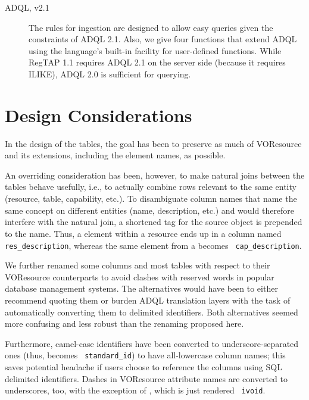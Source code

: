 \documentclass[11pt,a4paper]{ivoa}
\newcommand{\rtent}[1]{\texttt{\color{rtcolor} #1}}
\begin{document}
\begin{description}
\item[ADQL, v2.1 \citep{TODO}]The rules for ingestion are designed to allow
easy queries given the constraints of ADQL 2.1.  Also,
we give four functions that extend ADQL using the
language's built-in facility for user-defined functions.  While RegTAP
1.1 requires ADQL 2.1 on the server side (because it requires ILIKE),
ADQL 2.0 is sufficient for querying.
\end{description}


\section{Design Considerations}

\label{design}

In the design of the tables, the goal has been to preserve as much of
VOResource and its extensions, including the element names, as
possible.

An overriding consideration has been, however, to make natural joins
between the tables behave usefully, i.e., to actually combine rows
relevant to the same entity (resource, table, capability, etc.).
To disambiguate column names that name the same concept on different
entities (name, description, etc.) and would therefore interfere with
the natural join, a shortened tag for the source object
is prepended to the name.  Thus, a  element within
a resource ends up in a column named
\rtent{res\_description}, whereas the same element from a
 becomes \rtent{cap\_description}.

We further renamed some columns and most tables 
with respect to their VOResource
counterparts to avoid clashes with reserved words in popular database
management systems.  The alternatives would have been to either recommend
quoting them or burden ADQL translation layers with the task of
automatically converting them to delimited identifiers.  Both
alternatives seemed more confusing and less robust than the renaming
proposed here.

Furthermore, camel-case identifiers have been converted to
underscore-separated ones (thus,   becomes
\rtent{standard\_id}) to have all-lowercase column names; this saves
potential headache if users choose to reference the columns using SQL
delimited identifiers.  Dashes in VOResource attribute names are
converted to underscores, too, with the exception of
, which is just rendered \rtent{ivoid}.
\end{document}
